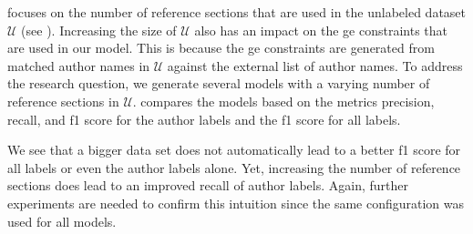 \bigskip

 focuses on the number of reference sections that are used in the unlabeled dataset $\mathcal{U}$ (see ).
Increasing the size of $\mathcal{U}$ also has an impact on the \gls{ge} constraints that are used in our model.
This is because the \gls{ge} constraints are generated from matched author names in $\mathcal{U}$ against the external list of author names.
To address the research question, we generate several models with a varying number of reference sections in $\mathcal{U}$.
 compares the models based on the metrics \gls{precision}, \gls{recall}, and \gls{f1 score} for the author labels and the \gls{f1 score} for all labels.
\begin{table}
\hspace{-0.25\textwidth}
\caption{Comparison of models that use different numbers of reference sections for the model learning.}
\label{tab:eval-training-size}
\end{table}
We see that a bigger data set does not automatically lead to a better \gls{f1 score} for all labels or even the author labels alone.
Yet, increasing the number of reference sections does lead to an improved \gls{recall} of author labels.
Again, further experiments are needed to confirm this intuition since the same configuration was used for all models.

\bigskip

